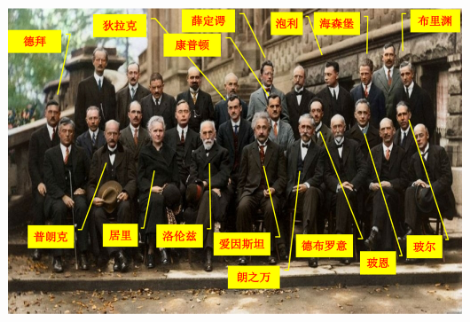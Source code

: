 \begin{frame} 
    \frametitle{}
    \includegraphics[width=0.9\textwidth]{figs/meet.png}
\end{frame} 

